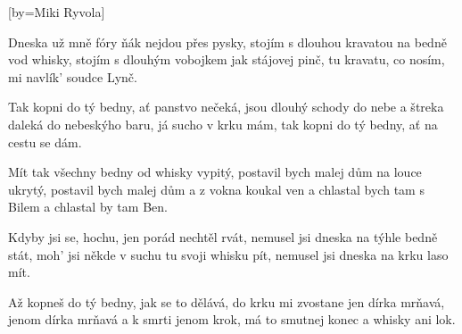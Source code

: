 [by={Miki Ryvola}]

\beginverse{}
Dneska už mně fóry ňák nejdou přes pysky,
stojím s dlouhou kravatou na bedně vod whisky,
stojím s dlouhým vobojkem jak stájovej pinč,
tu kravatu, co nosím, mi navlík' soudce Lynč. 
\endverse{}

\beginchorus{}
Tak kopni do tý bedny, ať panstvo nečeká,
jsou dlouhý schody do nebe a štreka daleká
do nebeskýho baru, já sucho v krku mám,
tak kopni do tý bedny, ať na cestu se dám. 
\endchorus{}

\beginverse{}
Mít tak všechny bedny od whisky vypitý,
postavil bych malej dům na louce ukrytý,
postavil bych malej dům a z vokna koukal ven
a chlastal bych tam s Bilem a chlastal by tam Ben.
\endverse{}

\beginchorus{}

\endchorus{}

\beginverse{}
Kdyby jsi se, hochu, jen porád nechtěl rvát,
nemusel jsi dneska na týhle bedně stát,
moh' jsi někde v suchu tu svoji whisku pít,
nemusel jsi dneska na krku laso mít.
\endverse{}

\beginchorus{}

\endchorus{}

\beginverse{}
Až kopneš do tý bedny, jak se to dělává,
do krku mi zvostane jen dírka mrňavá,
jenom dírka mrňavá a k smrti jenom krok,
má to smutnej konec a whisky ani lok.
\endverse{}

\beginchorus{}

\endchorus{}

\endsong{}
